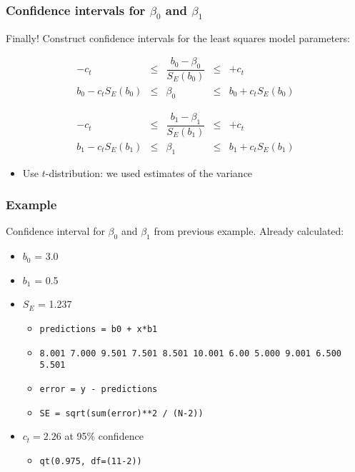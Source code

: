 \begin{frame}\frametitle{Confidence intervals for {\color{red}$\beta_0$ and $\beta_1$}}

	Finally! Construct confidence intervals for the least squares model parameters:

	$$
	\begin{array}{rcccl}
		- c_t &\leq& \dfrac{b_0 - \beta_0}{S_E(b_0)} &\leq & +c_t \\
		b_0 - c_t S_E(b_0) &\leq& \beta_0 &\leq& b_0 + c_t S_E(b_0)
	\end{array}
	$$

	\vspace{24pt}

	$$
	\begin{array}{rcccl}
		- c_t &\leq& \dfrac{b_1 - \beta_1}{S_E(b_1)} &\leq & +c_t\\
		b_1 - c_t S_E(b_1) &\leq& \beta_1 &\leq& b_1 + c_t S_E(b_1)
	\end{array}
	$$
	\begin{itemize}
		\item	Use $t$-distribution: we used estimates of the variance
	\end{itemize}
\end{frame}

\begin{frame}\frametitle{Example}

	Confidence interval for $\beta_0$ and $\beta_1$ from previous example. Already calculated:
	\begin{itemize}
		\item	$b_0$ = 3.0
		\item	$b_1$ = 0.5
		\item	$S_E$ = 1.237
		\begin{itemize}
			\item	\texttt{predictions = b0 + x*b1}
			\item	\texttt{8.001 7.000 9.501 7.501 8.501 10.001 6.00 5.000 9.001 6.500 5.501}
			\item	\texttt{error = y - predictions}
			\item	\texttt{SE = sqrt(sum(error)**2 / (N-2))}
		\end{itemize}
		\item	$c_t = 2.26$ at 95\% confidence
		\begin{itemize}
			\item	\texttt{qt(0.975, df=(11-2))}
		\end{itemize}
	\end{itemize}
\end{frame}

